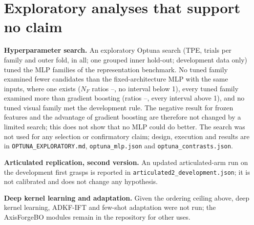 \documentclass[pdflatex,sn-mathphys-num]{sn-jnl}
\begin{document}
\begin{table}
\caption{Extended comparison with related work. $^\dagger$ preprint, not peer reviewed.}\label{tab:s-sota}
\centering\footnotesize

\end{table}

\section{Exploratory analyses that support no claim}

\textbf{Hyperparameter search.} An exploratory Optuna search (TPE, \optTrialsPerUnit{} trials per family and outer fold, \optTrials{} in all; one grouped inner hold-out; development data only) tuned the \optFamilies{} MLP families of the representation benchmark. No tuned family examined fewer candidates than the fixed-architecture MLP with the same inputs, where one exists ($N_F$ ratios \optFixedMin--\optFixedMax, no interval below 1), every tuned family examined more than gradient boosting (ratios \optLzeroMin--\optLzeroMax, every interval above 1), and no tuned visual family met the development rule. The negative result for frozen features and the advantage of gradient boosting are therefore not changed by a limited search; this does not show that no MLP could do better. The search was not used for any selection or confirmatory claim; design, execution and results are in \texttt{OPTUNA\_EXPLORATORY.md}, \texttt{optuna\_mlp.json} and \texttt{optuna\_contrasts.json}.

\textbf{Articulated replication, second version.} An updated articulated-arm run on the development first grasps is reported in \texttt{articulated2\_development.json}; it is not calibrated and does not change any hypothesis.

\textbf{Deep kernel learning and adaptation.} Given the ordering ceiling above, deep kernel learning, ADKF-IFT and few-shot adaptation were not run; the AxisForgeBO modules remain in the repository for other uses.


\end{document}
